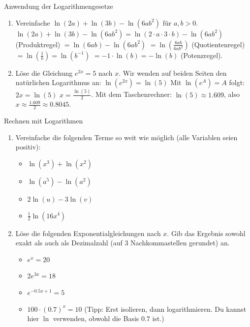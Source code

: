 \begin{beispielumgebung}{Anwendung der Logarithmengesetze}
\begin{enumerate}
    \item Vereinfache $\ln(2a) + \ln(3b) - \ln(6ab^2)$ für $a,b > 0$.
    $\ln(2a) + \ln(3b) - \ln(6ab^2) = \ln(2 \cdot a \cdot 3 \cdot b) - \ln(6ab^2)$ (Produktregel)
    $= \ln(6ab) - \ln(6ab^2)$
    $= \ln\left(\frac{6ab}{6ab^2}\right)$ (Quotientenregel)
    $= \ln\left(\frac{1}{b}\right) = \ln(b^{-1})$
    $= -1 \cdot \ln(b) = -\ln(b)$ (Potenzregel).

    \item Löse die Gleichung $e^{2x} = 5$ nach $x$.
    Wir wenden auf beiden Seiten den natürlichen Logarithmus an:
    $\ln(e^{2x}) = \ln(5)$
    Mit $\ln(e^A)=A$ folgt:
    $2x = \ln(5)$
    $x = \frac{\ln(5)}{2}$.
    Mit dem Taschenrechner: $\ln(5) \approx 1.609$, also $x \approx \frac{1.609}{2} \approx 0.8045$.
\end{enumerate}
\end{beispielumgebung}

\begin{aufgabenumgebung}{Rechnen mit Logarithmen}
\begin{enumerate}
    \item Vereinfache die folgenden Terme so weit wie möglich (alle Variablen seien positiv):
        \begin{itemize}
            \item $\ln(x^3) + \ln(x^2)$
            \item $\ln(a^5) - \ln(a^2)$
            \item $2\ln(u) - 3\ln(v)$
            \item $\frac{1}{2}\ln(16x^4)$
        \end{itemize}
    \item Löse die folgenden Exponentialgleichungen nach $x$. Gib das Ergebnis sowohl exakt als auch als Dezimalzahl (auf 3 Nachkommastellen gerundet) an.
        \begin{itemize}
            \item $e^x = 20$
            \item $2e^{3x} = 18$
            \item $e^{-0.5x+1} = 5$
            \item $100 \cdot (0.7)^x = 10$ (Tipp: Erst isolieren, dann logarithmieren. Du kannst hier $\ln$ verwenden, obwohl die Basis $0.7$ ist.)
        \end{itemize}
\end{enumerate}
\end{aufgabenumgebung}

